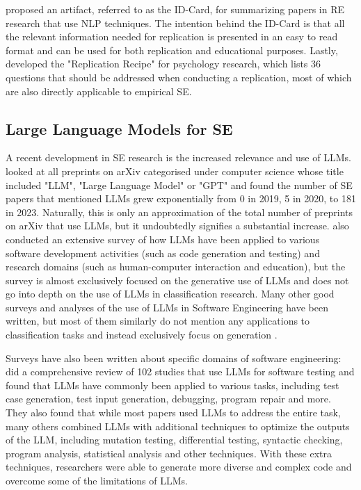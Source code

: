 \documentclass[a4paper]{article}
\newcommand{\comment}[1]{}
\begin{document}
\textcite{Abualhaija2024} proposed an artifact, referred to as the ID-Card, for summarizing papers in RE research that use NLP techniques. The intention behind the ID-Card is that all the relevant information needed for replication is presented in an easy to read format and can be used for both replication and educational purposes. Lastly, \textcite{Brandt2014} developed the "Replication Recipe" for psychology research, which lists 36 questions that should be addressed when conducting a replication, most of which are also directly applicable to empirical SE. 

\subsection{Large Language Models for SE}
A recent development in SE research is the increased relevance and use of LLMs. \textcite{fan2023} looked at all preprints on arXiv categorised under computer science whose title included "LLM", "Large Language Model" or "GPT" and found the number of SE papers that mentioned LLMs grew exponentially from 0 in 2019, 5 in 2020, to 181 in 2023. Naturally, this is only an approximation of the total number of preprints on arXiv that use LLMs, but it undoubtedly signifies a substantial increase. \citeauthor{fan2023} also conducted an extensive survey of how LLMs have been applied to various software development activities (such as code generation and testing) and research domains (such as human-computer interaction and education), but the survey is almost exclusively focused on the generative use of LLMs and does not go into depth on the use of LLMs in classification research. Many other good surveys and analyses of the use of LLMs in Software Engineering have been written, but most of them similarly do not mention any applications to classification tasks and instead exclusively focus on generation \cite{Belzner2024,Zheng2024,Ozkaya2023}.

Surveys have also been written about specific domains of software engineering: \textcite{wang2024} did a comprehensive review of 102 studies that use LLMs for software testing and found that LLMs have commonly been applied to various tasks, including test case generation, test input generation, debugging, program repair and more\comment{REWRITE WITH TABLE OF TASKS}. They also found that while most papers used LLMs to address the entire task, many others combined LLMs with additional techniques to optimize the outputs of the LLM, including mutation testing, differential testing, syntactic checking, program analysis, statistical analysis and other techniques. With these extra techniques, researchers were able to generate more diverse and complex code and overcome some of the limitations of LLMs. 
\end{document}
